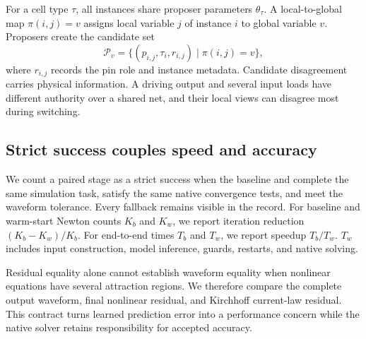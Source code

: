For a cell type $\tau$, all instances share proposer parameters $\theta_\tau$. A local-to-global map $\pi(i,j)=v$ assigns local variable $j$ of instance $i$ to global variable $v$. Proposers create the candidate set
\begin{equation}
\mathcal{P}_v=\{(p_{i,j},\tau_i,r_{i,j})\mid \pi(i,j)=v\},
\label{eq:candidates}
\end{equation}
where $r_{i,j}$ records the pin role and instance metadata. Candidate disagreement carries physical information. A driving output and several input loads have different authority over a shared net, and their local views can disagree most during switching.

\subsection{Strict success couples speed and accuracy}

We count a paired stage as a strict success when the baseline and \system{} complete the same simulation task, satisfy the same native convergence tests, and meet the waveform tolerance. Every fallback remains visible in the record. For baseline and warm-start Newton counts $K_b$ and $K_w$, we report iteration reduction $(K_b-K_w)/K_b$. For end-to-end times $T_b$ and $T_w$, we report speedup $T_b/T_w$. $T_w$ includes input construction, model inference, guards, restarts, and native solving.

Residual equality alone cannot establish waveform equality when nonlinear equations have several attraction regions. We therefore compare the complete output waveform, final nonlinear residual, and Kirchhoff current-law residual. This contract turns learned prediction error into a performance concern while the native solver retains responsibility for accepted accuracy.

